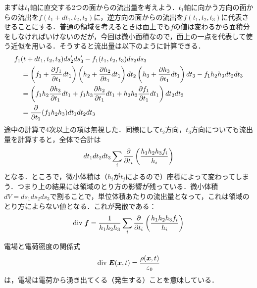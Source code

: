 \documentclass[a4paper,10pt,uplatex]{jsarticle}
\renewcommand{\div}{\mathrm{div}\;}
\newcommand{\E}{\vb*{E}}
\newcommand{\x}{\vb*{x}}
\begin{document}
まずは$t_1$軸に直交する2つの面からの流出量を考えよう．$t_1$軸に向かう方向の面からの流出を$f(t_1+dt_1,t_2,t_3)$に，逆方向の面からの流出を$f(t_1,t_2,t_3)$に代表させることにする．普通の領域を考えるときは面上でも$f$の値は変わるから面積分をしなければいけないのだが，今回は微小面積なので，面上の一点を代表して使う近似を用いる．そうすると流出量は以下のように計算できる．
\begin{align}
    &f_1(t+dt_1, t_2, t_3) ds_2' ds_3' - f_1(t_1, t_2, t_3) ds_2 ds_3 \\
    &\quad = \left(f_1 + \pdv{f_1}{t_1}dt_1\right)\left(h_2+\pdv{h_2}{t_1}dt_1\right)dt_2\left(h_3+\pdv{h_3}{t_1}dt_1\right)dt_3 - f_1h_2h_3dt_2dt_3 \\
    &\quad = \left(f_1h_2\pdv{h_3}{t_1}dt_1 + f_1h_3\pdv{h_2}{t_1}dt_1 + h_2h_3\pdv{f_1}{t_1}dt_1\right)dt_2dt_3 \\
    &\quad = \pdv{t_1}(f_1h_2h_3)dt_1dt_2dt_3
\end{align}
途中の計算で4次以上の項は無視した．同様にして$t_2$方向，$t_3$方向についても流出量を計算すると，全体で合計は
\begin{equation}
    dt_1dt_2dt_3 \sum_i \pdv{t_i}\left(\frac{h_1h_2h_3f_i}{h_i}\right)
\end{equation}
となる．ところで，微小体積は（$h_i$が$t_j$によるので）座標によって変わってしまう．つまり上の結果には領域のとり方の影響が残っている．微小体積$dV = ds_1ds_2ds_3$で割ることで，単位体積あたりの流出量となって，これは領域のとり方によらない値となる．これが発散である：
\begin{equation}
    \div \vb*{f} = \frac{1}{h_1h_2h_3} \sum_i \pdv{t_i}\left(\frac{h_1h_2h_3f_i}{h_i}\right)
\end{equation}

電場と電荷密度の関係式
\begin{equation}
    \div \E(\x,t) = \frac{\rho(\x,t)}{\varepsilon_0}
\end{equation}
は，電場は電荷から湧き出てくる（発生する）ことを意味している．
\end{document}
